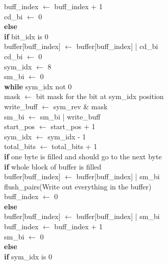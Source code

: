 \documentclass[12pt]{article}
\begin{document}
\indent \indent \indent \indent buff\_index $\leftarrow$ buff\_index + 1 \\
\indent \indent \indent cd\_bi $\leftarrow$ 0 \\
\indent \indent \textbf{else} \\
\indent \indent \indent \textbf{if} bit\_idx is 0 \\
\indent \indent \indent \indent buffer[buff\_index] $\leftarrow$ buffer[buff\_index] | cd\_bi \\
\indent \indent \indent \indent cd\_bi $\leftarrow$ 0 \\
\indent sym\_idx $\leftarrow$ 8 \\
\indent sm\_bi $\leftarrow$ 0 \\
\indent \textbf{while} sym\_idx not 0 \\
\indent \indent mask $\leftarrow$ bit mask for the bit at sym\_idx position \\
\indent \indent write\_buff $\leftarrow$ sym\_rev \& mask \\
\indent \indent sm\_bi $\leftarrow$ sm\_bi | write\_buff \\
\indent \indent start\_pos $\leftarrow$ start\_pos + 1 \\
\indent \indent sym\_idx $\leftarrow$ sym\_idx - 1 \\
\indent \indent total\_bits $\leftarrow$ total\_bits + 1 \\
\indent \indent \textbf{if} one byte is filled and should go to the next byte \\
\indent \indent \indent \textbf{if} whole block of buffer is filled \\
\indent \indent \indent \indent buffer[buff\_index] $\leftarrow$ buffer[buff\_index] | sm\_bi \\
\indent \indent \indent \indent flush\_pairs(Write out everything in the buffer) \\
\indent \indent \indent \indent buff\_index $\leftarrow$ 0 \\
\indent \indent \indent \textbf{else} \\
\indent \indent \indent \indent buffer[buff\_index] $\leftarrow$ buffer[buff\_index] | sm\_bi \\
\indent \indent \indent \indent buff\_index $\leftarrow$ buff\_index + 1 \\
\indent \indent \indent sm\_bi $\leftarrow$ 0 \\
\indent \indent \textbf{else} \\
\indent \indent \indent \textbf{if} sym\_idx is 0 \\
\end{document}
